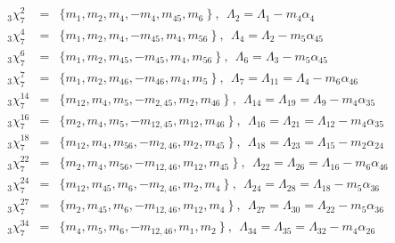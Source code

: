 \documentclass[a4paper]{jpconf}
\def\bb {\begin {eqnarray}}
\def\eqnn#1{\bb\label{#1}}
\def\eea {\end {eqnarray}}
\def\nn{\nonumber}
\def\a{\alpha}
\def\L{\Lambda}
\begin{document}
  \eqnn{slt73}
 _3\chi^2_7 &=& \{ m_1, m_2, m_{4}, -m_4, m_{45}, m_6 \   \} \ ,~~\L_2 = \L_1 - m_4 \a_4 \\ %
  _3\chi^4_7 &=& \{ m_1, m_2, m_{4}, -m_{45}, m_{4}, m_{56} \   \} \ ,~~\L_4 = \L_2 - m_5 \a_{45} \nn\\ %
   _3\chi^6_7 &=& \{ m_1, m_{2}, m_{45}, -m_{45}, m_{4}, m_{56} \   \} \ ,~~\L_6 = \L_3 - m_5 \a_{45} \nn\\ %
_3\chi^7_7 &=& \{ m_1, m_2, m_{46}, -m_{46}, m_{4}, m_5 \   \} \ ,~~\L_7 = \L_{11} = \L_4 - m_6 \a_{46} \nn\\  %
  _3\chi^{14}_7 &=& \{ m_{12}, m_{4}, m_{5}, -m_{2,45}, m_{2}, m_{46} \   \} \ ,~~\L_{14} = \L_{19} = \L_9 - m_4 \a_{35} \nn\\ %
 _3\chi^{16}_7 &=& \{ m_2, m_{4}, m_{5}, -m_{12,45}, m_{12}, m_{46} \   \} \ ,~~\L_{16} = \L_{21} = \L_{12} - m_4 \a_{35} \nn\\ %
  _3\chi^{18}_7 &=& \{ m_{12}, m_{4}, m_{56}, -m_{2,46}, m_{2}, m_{45} \   \} \ ,~~\L_{18} = \L_{23} = \L_{15} - m_2 \a_{24}  \nn\\ %
 _3\chi^{22}_7 &=& \{ m_{2}, m_{4}, m_{56}, -m_{12,46}, m_{12}, m_{45} \   \} \ ,~~\L_{22} = \L_{26} = \L_{16} - m_6 \a_{46} \nn\\ %
_3\chi^{24}_7 &=& \{ m_{12}, m_{45}, m_{6}, -m_{2,46}, m_{2}, m_{4} \   \} \ ,~~\L_{24} = \L_{28} = \L_{18} - m_5 \a_{36}  \nn\\ %
   _3\chi^{27}_7 &=& \{ m_{2}, m_{45}, m_{6}, -m_{12,46}, m_{12}, m_{4} \   \} \ ,~~\L_{27} = \L_{30} =\L_{22} - m_5 \a_{36} \nn\\ %
  _3\chi^{34}_7 &=& \{ m_{4}, m_{5}, m_{6}, -m_{12,46}, m_{1}, m_{2} \   \} \ ,~~\L_{34} = \L_{35} = \L_{32} - m_4 \a_{26} \nn\\  %
  \nn\eea %
\end{document}
